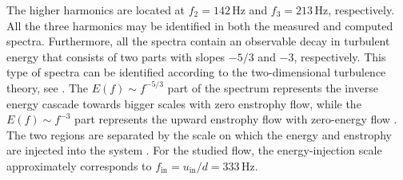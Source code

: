 The higher harmonics are located at $f_{2} = 142\,\mathrm{Hz}$ and $f_{3} = 213\,\mathrm{Hz}$, respectively. All the three harmonics may be identified in both the measured and computed spectra. Furthermore, all the spectra contain an observable decay in turbulent energy {that consists of two parts with slopes $-5/3$ and $-3$, respectively. This type of spectra can be identified according to the two-dimensional turbulence theory, see \citep{kraichnan1967,rutgers1998}. {The $E(f)\sim f^{-5/3}$ part of the spectrum represents the inverse energy cascade towards bigger scales with zero enstrophy flow, while the $E(f)\sim f^{-3}$ part represents the upward enstrophy flow with zero-energy flow \citep{kraichnan1967,rose1978}}. The two regions are separated by the scale on {which the energy and enstrophy are injected into the system} \citep{rose1978}. For the studied flow, the energy-injection scale approximately corresponds to $f_{\mathrm{in}} = u_{\mathrm{in}}/d = 333\,$Hz.}


